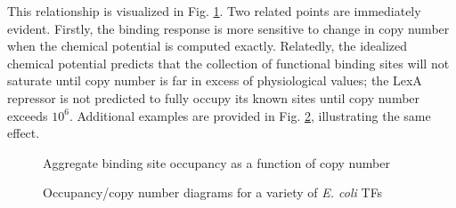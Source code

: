 \documentclass{article}
\newif\ifatlab
\begin{document}




  This relationship is visualized in Fig.
  \ref{fig:occupancy_vs_copy_number}.  Two related points are
  immediately evident.  Firstly, the binding response is more
  sensitive to change in copy number when the chemical potential is
  computed exactly.  Relatedly, the idealized chemical potential
  predicts that the collection of functional binding sites will not
  saturate until copy number is far in excess of physiological values;
  the LexA repressor is not predicted to fully occupy its known sites
  until copy number exceeds $10^6$.  Additional examples are provided
  in Fig. \ref{fig:occupancy_vs_copy_number_examples}, illustrating
  the same effect.

  \begin{figure}[ht]
    \centering
    \ifatlab
    \texttt{[image: ../../results/fig/k\_occupancy\_figs/LexA\_k\_occupancy\_fig.png]}
    \fi
    \caption{Aggregate binding site occupancy as a function of copy number}
    \label{fig:occupancy_vs_copy_number}
  \end{figure}

  \begin{figure}[ht]
  \centering
  \ifatlab
\subfigure{\texttt{[image: ../../results/fig/k\_occupancy\_figs/Crp\_k\_occupancy\_fig.png]}}
\subfigure{\texttt{[image: ../../results/fig/k\_occupancy\_figs/FliA\_k\_occupancy\_fig.png]}}
\subfigure{\texttt{[image: ../../results/fig/k\_occupancy\_figs/Fur\_k\_occupancy\_fig.png]}}
\subfigure{\texttt{[image: ../../results/fig/k\_occupancy\_figs/OxyR\_k\_occupancy\_fig.png]}}
\fi
  \caption{Occupancy/copy number diagrams for a variety of \textit{E. coli} TFs}
  \label{fig:occupancy_vs_copy_number_examples}
\end{figure}
\end{document}
